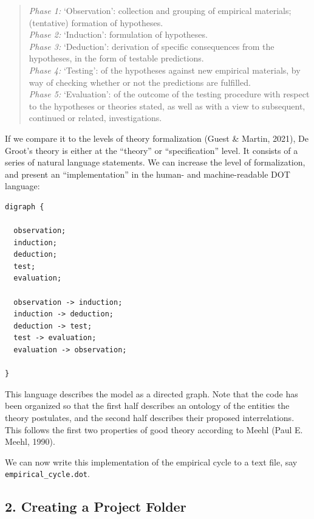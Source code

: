 \documentclass[
  man,floatsintext]{apa6}
\begin{document}
\begin{quote}
\emph{Phase 1:} `Observation': collection and grouping of empirical materials; (tentative) formation of hypotheses.\\
\emph{Phase 2:} `Induction': formulation of hypotheses.\\
\emph{Phase 3:} `Deduction': derivation of specific consequences from the hypotheses, in the form of testable predictions.\\
\emph{Phase 4:} `Testing': of the hypotheses against new empirical materials, by way of checking whether or not the predictions are fulfilled.\\
\emph{Phase 5:} `Evaluation': of the outcome of the testing procedure with respect to the hypotheses or theories stated, as well as with a view to subsequent, continued or related, investigations.
\end{quote}

If we compare it to the levels of theory formalization (Guest \& Martin, 2021),
De Groot's theory is either at the ``theory'' or ``specification'' level.
It consists of a series of natural language statements.
We can increase the level of formalization, and present an ``implementation'' in the human- and machine-readable DOT language:

\begin{verbatim}
digraph {

  observation;
  induction;
  deduction;
  test;
  evaluation;
  
  observation -> induction;
  induction -> deduction;
  deduction -> test;
  test -> evaluation;
  evaluation -> observation;
  
}
\end{verbatim}

This language describes the model as a directed graph.
Note that the code has been organized so that the first half describes an ontology of the entities the theory postulates,
and the second half describes their proposed interrelations.
This follows the first two properties of good theory according to Meehl (Paul E. Meehl, 1990).

We can now write this implementation of the empirical cycle to a text file, say \texttt{empirical\_cycle.dot}.

\subsection{2. Creating a Project Folder}\label{creating-a-project-folder}
\end{document}
